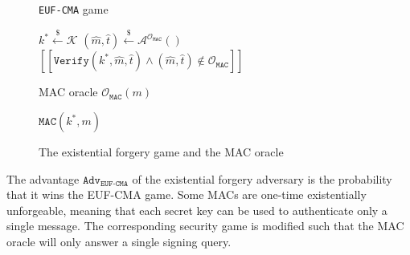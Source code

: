 \documentclass[runningheads]{llncs}
\newcommand{\mac}{\texttt{MAC}}
\newcommand{\verify}{\texttt{Verify}}
\newcommand{\leftsample}{\stackrel{\$}{\leftarrow}}
\newcommand{\llbrack}{[\![}
\newcommand{\rrbrack}{]\!]}
\newcommand{\adv}{\texttt{Adv}}
\begin{document}
\begin{figure}[H]
    \centering
    \begin{minipage}[t]{0.53\textwidth}
        \begin{algorithm}[H]
            \caption*{\texttt{EUF-CMA} game}
            \begin{algorithmic}[1]
                \State $k^\ast \leftsample \mathcal{K}$
                \State $(\hat{m}, \hat{t}) \leftsample \mathcal{A}^{\mathcal{O}_\mac}()$
                \State \Return $
                    \llbrack \verify(k^\ast, \hat{m}, \hat{t}) 
                    \land (\hat{m}, \hat{t}) \not\in \mathcal{O}_\mac
                    \rrbrack
                $
            \end{algorithmic}
        \end{algorithm}
    \end{minipage}\hspace{0.3cm}
    \begin{minipage}[t]{0.4\textwidth}
        \begin{algorithm}[H]
            \caption*{MAC oracle $\mathcal{O}_\mac(m)$}
            \begin{algorithmic}[1]
                \State \Return $\mac(k^\ast, m)$
            \end{algorithmic}
        \end{algorithm}
    \end{minipage}
    \caption{The existential forgery game and the MAC oracle}\label{fig:euf-cma-game}
\end{figure}

The advantage $\adv_\texttt{EUF-CMA}$ of the existential forgery adversary is the probability that it wins the EUF-CMA game. Some MACs are one-time existentially unforgeable, meaning that each secret key can be used to authenticate only a single message. The corresponding security game is modified such that the MAC oracle will only answer a single signing query.

\end{document}
